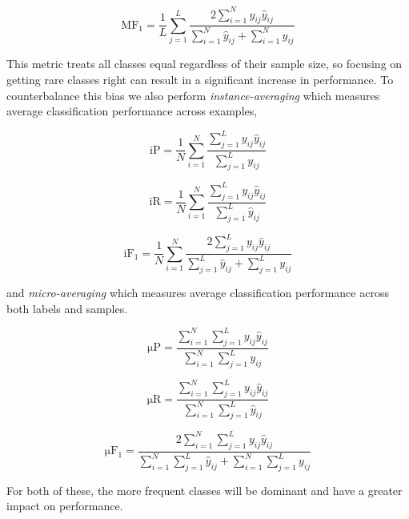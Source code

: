 \documentclass[12pt,journal,compsoc]{IEEEtran}
\begin{document}
\begin{equation}
\mathrm{MF_1} = \frac{1}{L}\sum_{j=1}^{L}\frac{2\sum_{i=1}^{N}y_{ij}\hat{y}_{ij}}{\sum_{i=1}^{N}\hat{y}_{ij}+\sum_{i=1}^{N}y_{ij}}
\label{eq:MF1}
\end{equation}

This metric treats all classes equal regardless of their sample size, so focusing on getting rare classes right can result in a significant increase in performance. To counterbalance this bias we also perform \textit{instance-averaging} which measures average classification performance across examples,

\begin{equation}
\mathrm{iP} = \frac{1}{N}\sum_{i=1}^{N}\frac{\sum_{j=1}^{L}y_{ij}\hat{y}_{ij}}{\sum_{j=1}^{L}y_{ij}}
\label{eq:iP}
\end{equation}

\begin{equation}
\mathrm{iR} = \frac{1}{N}\sum_{i=1}^{N}\frac{\sum_{j=1}^{L}y_{ij}\hat{y}_{ij}}{\sum_{j=1}^{L}\hat{y}_{ij}}
\label{eq:iR}
\end{equation}

\begin{equation}
\mathrm{iF_1} = \frac{1}{N}\sum_{i=1}^{N}\frac{2\sum_{j=1}^{L}y_{ij}\hat{y}_{ij}}{\sum_{j=1}^{L}\hat{y}_{ij}+\sum_{j=1}^{L}y_{ij}}
\label{eq:iF1}
\end{equation}

and \textit{micro-averaging} which measures average classification performance across both labels and samples.

\begin{equation}
\mathrm{\mu P} = \frac{\sum_{i=1}^{N}\sum_{j=1}^{L}y_{ij}\hat{y}_{ij}}{\sum_{i=1}^{N}\sum_{j=1}^{L}y_{ij}}
\label{eq:mP}
\end{equation}

\begin{equation}
\mathrm{\mu R} = \frac{\sum_{i=1}^{N}\sum_{j=1}^{L}y_{ij}\hat{y}_{ij}}{\sum_{i=1}^{N}\sum_{j=1}^{L}\hat{y}_{ij}}
\label{eq:mR}
\end{equation}

\begin{equation}
\mathrm{\mu F_1} = \frac{2\sum_{i=1}^{N}\sum_{j=1}^{L}y_{ij}\hat{y}_{ij}}{\sum_{i=1}^{N}\sum_{j=1}^{L}\hat{y}_{ij}+\sum_{i=1}^{N}\sum_{j=1}^{L}y_{ij}}
\label{eq:mF1}
\end{equation}

For both of these, the more frequent classes will be dominant and have a greater impact on performance.
\end{document}
